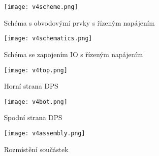 \begin{figure}[h]
\centering
\texttt{[image: v4scheme.png]}
\caption[]{Schéma s obvodovými prvky s řízeným napájením}
\end{figure}
\begin{figure}[h]
\centering
\texttt{[image: v4schematics.png]}
\caption[]{Schéma se zapojením IO s řízeným napájením}
\end{figure}
\begin{figure}[h]
\centering
\texttt{[image: v4top.png]}
\caption[]{Horní strana DPS}
\end{figure}
\begin{figure}[h]
\centering
\texttt{[image: v4bot.png]}
\caption[]{Spodní strana DPS}
\end{figure}
\begin{figure}[h]
\centering
\texttt{[image: v4assembly.png]}
\caption[]{Rozmístění součástek}
\end{figure}